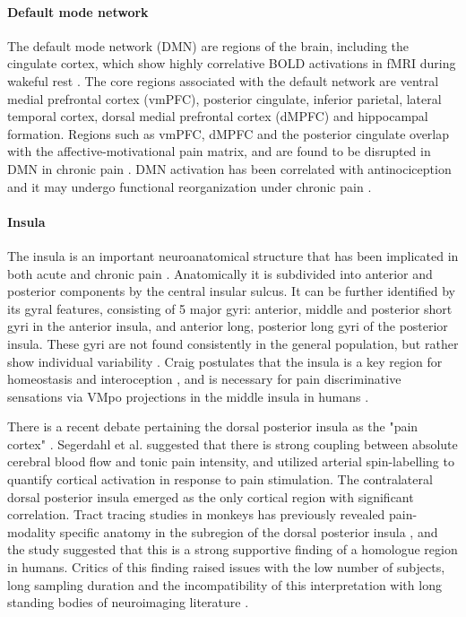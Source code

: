 \paragraph{Default mode network}
The default mode network (DMN) are regions of the brain, including the cingulate cortex, which show highly correlative BOLD activations in fMRI during wakeful rest \cite{Greicius2003,Raichle2015}. The core regions associated with the default network are ventral medial prefrontal cortex (vmPFC), posterior cingulate, inferior parietal, lateral temporal cortex, dorsal medial prefrontal cortex (dMPFC) and hippocampal formation. Regions such as vmPFC, dMPFC and the posterior cingulate overlap with the affective-motivational pain matrix, and are found to be disrupted in DMN in chronic pain \cite{Baliki2008}. DMN activation has been correlated with antinociception \cite{Kucyi2013} and it may undergo functional reorganization under chronic pain \cite{Baliki2014}. 

\paragraph{Insula}

The insula is an important neuroanatomical structure that has been implicated in both acute \cite{Lorenz2005,Starr2009} and chronic pain \cite{May2008,Jensen2016}. Anatomically it is subdivided into anterior and posterior components by the central insular sulcus. It can be further identified by its gyral features, consisting of 5 major gyri: anterior, middle and posterior short gyri in the anterior insula, and anterior long, posterior long gyri of the posterior insula. These gyri are not found consistently in the general population, but rather show individual variability \cite{Rosen2015}. Craig postulates that the insula is a key region for homeostasis and interoception \cite{Craig2003b}, and is necessary for pain discriminative sensations via VMpo projections in the middle insula in humans \cite{Craig2003a}. 

There is a recent debate pertaining the dorsal posterior insula as the "pain cortex" \cite{Segerdahl2015a}. Segerdahl et al. suggested that there is strong coupling between absolute cerebral blood flow and tonic pain intensity, and utilized arterial spin-labelling to quantify cortical activation in response to pain stimulation. The contralateral dorsal posterior insula emerged as the only cortical region with significant correlation. Tract tracing studies in monkeys has previously revealed pain-modality specific anatomy in the subregion of the dorsal posterior insula \cite{Craig2014}, and the study suggested that this is a strong supportive finding of a homologue region in humans. Critics of this finding raised issues with the low number of subjects, long sampling duration and the incompatibility of this interpretation with long standing bodies of neuroimaging literature \cite{Davis2015}. 


